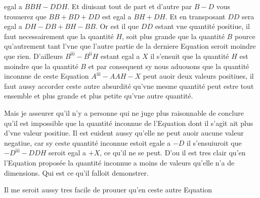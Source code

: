 \documentclass[11pt,a4paper]{article}
\begin{document}
egal a $BBH - DDH$. Et diuisant tout de part et d'autre par $B - D$ vous trouuerez que $BB + BD + DD$ est egal a $BH + DH$. Et en transposant $DD$ sera egal a \struck{\ill{}} $DH - DB + BH - BB$. Or est il que $DD$ \struck{\ill{}} estant vne quantité positiue, il faut necessairement que la quantité $H$, soit plus grande que la quantité $B$ pource qu'autrement tant l'vne que l'autre partie de la derniere Equation seroit moindre que rien. D'ailleurs $B^{\mathrm{iii}} - B^{\mathrm{ii}}H$ estant egal a $X$ il s'ensuit que la quantité $H$ est moindre que la quantité $B$ et par consequent sy nous aduouons que la quantité inconnue de ceste Equation $A^{\mathrm{iii}} - AAH - X$ peut auoir deux valeurs positiues, il faut aussy accorder ceste autre absurdité qu'vne mesme quantité peut estre tout ensemble et plus grande et plus petite qu'vne autre quantité.

Mais je  asseurer qu'il n'y a personne qui ne juge plus raisonnable de conclure qu'il est impossible que la quantité inconnue de l'Equation dont il s'agit ait plus d'vne valeur positiue. Il est euident aussy qu'elle ne peut auoir aucune valeur negatiue, car sy ceste quantité inconnue estoit egale a $-D$ il s'ensuiuroit que $-D^{\mathrm{iii}} - DDH$ seroit egal a $+X$, ce qu'il ne se peut. D'ou il est tres clair qu'en l'Equation proposée la quantité inconnue a moins de valeurs qu'elle n'a de dimensions. Qui est ce qu'il falloit demonstrer.

Il me seroit aussy tres facile de prouuer qu'en ceste autre Equation

\end{document}
